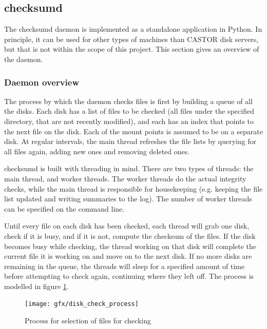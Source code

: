 \subsection{checksumd}
\label{sec:checksumd_overview}
The checksumd daemon is implemented as a standalone application in Python. In principle, it can be used for other types of machines than CASTOR disk servers, but that is not within the scope of this project. This section gives an overview of the daemon.

\subsubsection{Daemon overview}

The process by which the daemon checks files is first by building a queue of all the disks. Each disk has a list of files to be checked (all files under the specified directory, that are not recently modified), and each has an index that points to the next file on the disk. Each of the mount points is assumed to be on a separate disk. At regular intervals, the main thread refreshes the file lists by querying for all files again, adding new ones and removing deleted ones. 

checksumd is built with threading in mind. There are two types of threads: the main thread, and worker threads. The worker threads do the actual integrity checks, while the main thread is responsible for housekeeping (e.g. keeping the file list updated and writing summaries to the log). The number of worker threads can be specified on the command line.

Until every file on each disk has been checked, each thread will grab one disk, check if it is busy, and if it is not, compute the checksum of the files. If the disk becomes busy while checking, the thread working on that disk will complete the current file it is working on and move on to the next disk. If no more disks are remaining in the queue, the threads will sleep for a specified amount of time before attempting to check again, continuing where they left off. The process is modelled in figure \ref{fig:checksum_process}.

\begin{figure}[ht]
\centering
\texttt{[image: gfx/disk\_check\_process]}
\caption{Process for selection of files for checking}
\label{fig:checksum_process}
\end{figure}

